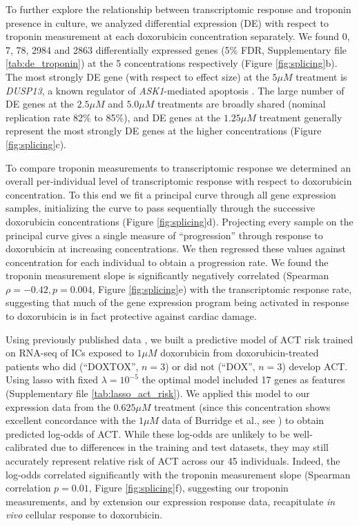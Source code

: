 \documentclass[9pt,lineno]{elife}
\begin{document}
To further explore the relationship between transcriptomic response and troponin presence in culture, we analyzed differential expression (DE) with respect to troponin measurement at each doxorubicin concentration separately. We found 0, 7, 78, 2984 and 2863 differentially expressed genes (5\% FDR, Supplementary file \ref{tab:de_troponin}) at the 5 concentrations respectively (Figure \ref{fig:splicing}b). The most strongly DE gene (with respect to effect size) at the $5 \mu M$ treatment is \emph{DUSP13}, a known regulator of \emph{ASK1}-mediated apoptosis \citep{park2010positive}. The large number of DE genes at the $2.5 \mu M$ and $5.0 \mu M$ treatments are broadly shared (nominal replication rate 82\% to 85\%), and DE genes at the $1.25 \mu M$ treatment generally represent the most strongly DE genes at the higher concentrations (Figure \ref{fig:splicing}c). 

To compare troponin measurements to transcriptomic response we determined an overall per-individual level of transcriptomic response with respect to doxorubicin concentration. To this end we fit a principal curve\citep{hastie1989principal} through all gene expression samples, initializing the curve to pass sequentially through the successive doxorubicin concentrations (Figure \ref{fig:splicing}d). Projecting every sample on the principal curve gives a single measure of ``progression'' through response to doxorubicin at increasing concentrations. We then regressed these values against concentration for each individual to obtain a progression rate. We found the troponin measurement slope is significantly negatively correlated (Spearman $\rho=-0.42, p=0.004$, Figure \ref{fig:splicing}e) with the transcriptomic response rate, suggesting that much of the gene expression program being activated in response to doxorubicin is in fact protective against cardiac damage. 

Using previously published data \citep{Burridge2016}, we built a predictive model of ACT risk trained on RNA-seq of ICs exposed to $1 \mu M$ doxorubicin from doxorubicin-treated patients who did (``DOXTOX'', $n=3$) or did not (``DOX'', $n=3$) develop ACT. Using lasso with fixed $\lambda=10^{-5}$ the optimal model included 17 genes as features (Supplementary file \ref{tab:lasso_act_risk}). We applied this model to our expression data from the $0.625 \mu M$ treatment (since this concentration shows excellent concordance with the $1 \mu M$ data of Burridge et al., see ) to obtain predicted log-odds of ACT. While these log-odds are unlikely to be well-calibrated due to differences in the training and test datasets, they may still accurately represent relative risk of ACT across our 45 individuals. Indeed, the log-odds correlated significantly with the troponin measurement slope (Spearman correlation $p=0.01$, Figure \ref{fig:splicing}f), suggesting our troponin measurements, and by extension our expression response data, recapitulate \emph{in vivo} cellular response to doxorubicin. 
\end{document}
